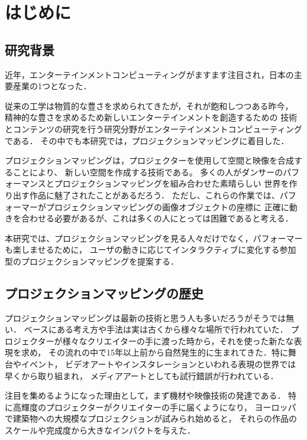 \chapter{はじめに}
\thispagestyle{fancy}
\setcounter{page}{1}
\renewcommand{\thepage}{\arabic{page}}

\section{研究背景}
近年，エンターテインメントコンピューティングがますます注目され，日本の主要産業の1つとなった．

従来の工学は物質的な豊さを求められてきたが，それが飽和しつつある昨今，
精神的な豊さを求めるため新しいエンターテインメントを創造するための
技術とコンテンツの研究を行う研究分野がエンターテインメントコンピューティングである．
その中でも本研究では，プロジェクションマッピングに着目した．

プロジェクションマッピングは，プロジェクターを使用して空間と映像を合成することにより、
新しい空間を作成する技術である。
多くの人がダンサーのパフォーマンスとプロジェクションマッピングを組み合わせた素晴らしい
世界を作り出す作品に魅了されたことがあるだろう．
ただし、これらの作業では、パフォーマーがプロジェクションマッピングの画像オブジェクトの座標に
正確に動きを合わせる必要があるが、これは多くの人にとっては困難であると考える．

本研究では、プロジェクションマッピングを見る人々だけでなく，パフォーマーも楽しませるために，
ユーザの動きに応じてインタラクティブに変化する参加型のプロジェクションマッピングを提案する．

\clearpage

\section{プロジェクションマッピングの歴史}
プロジェクションマッピングは最新の技術と思う人も多いだろうがそうでは無い．
ベースにある考え方や手法は実は古くから様々な場所で行われていた．
プロジェクターが様々なクリエイターの手に渡った時から，それを使った新たな表現を求め，
その流れの中で15年以上前から自然発生的に生まれてきた．特に舞台やイベント，
ビデオアートやインスタレーションといわれる表現の世界では早くから取り組まれ，
メディアアートとしても試行錯誤が行われている．

注目を集めるようになった理由として，まず機材や映像技術の発達である．
特に高輝度のプロジェクターがクリエイターの手に届くようになり，
ヨーロッパで建築物への大規模なプロジェクションが試みられ始めると，
それらの作品のスケールや完成度から大きなインパクトを与えた．

